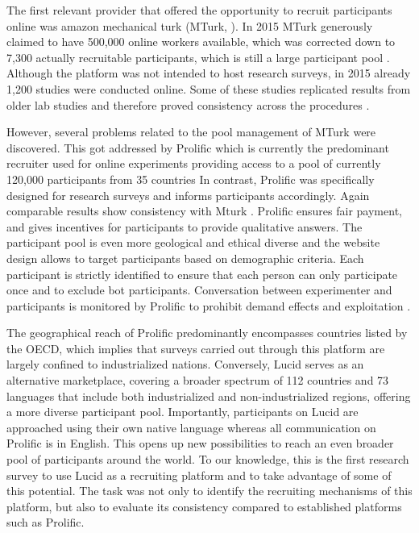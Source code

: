 The first relevant provider that offered the opportunity to recruit participants online was amazon mechanical turk (MTurk, \parencite{mturk}). In 2015 MTurk generously claimed to have 500,000 online workers available, which was corrected down to 7,300 actually recruitable participants, which is still a large participant pool \parencite{stewartAverage2015}. Although the platform was not intended to host research surveys, in 2015 already 1,200 studies were conducted online. Some of these studies replicated results from older lab studies and therefore proved consistency across the procedures \parencite{CrumpEval2013, AmirEcoGames2012, hortonOnline2011}.

However, several problems related to the pool management of MTurk were discovered. This got addressed by Prolific \parencite{prolific} which is currently the predominant recruiter used for online experiments providing access to a pool of currently 120,000 participants from 35 countries %
In contrast, Prolific was specifically designed for research surveys and informs participants accordingly. Again comparable results show consistency with Mturk \parencite{peerTurk2017}. Prolific ensures fair payment, and gives incentives for participants to provide qualitative answers. The participant pool is even more geological and ethical diverse and the website design allows to target participants based on demographic criteria. Each participant is strictly identified to ensure that each person can only participate once and to exclude bot participants. Conversation between experimenter and participants is monitored by Prolific to prohibit demand effects and exploitation \parencite{NeckaMturkProblematic2016}.

The geographical reach of Prolific predominantly encompasses countries listed by the OECD, which implies that surveys carried out through this platform are largely confined to industrialized nations. Conversely, Lucid \parencite{lucid} serves as an alternative marketplace, covering a broader spectrum of 112 countries and 73 languages that include both industrialized and non-industrialized regions, offering a more diverse participant pool. Importantly, participants on Lucid are approached using their own native language whereas all communication on Prolific is in English.
This opens up new possibilities to reach an even broader pool of participants around the world. To our knowledge, this is the first research survey to use Lucid as a recruiting platform and to take advantage of some of this potential.
The task was not only to identify the recruiting mechanisms of this platform, but also to evaluate its consistency compared to established platforms such as Prolific.




